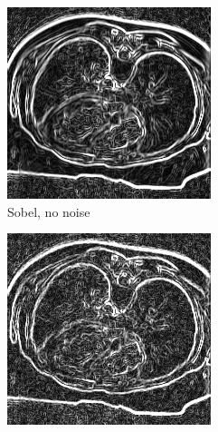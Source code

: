 \begin{figure}[H]
  \centering
  
  \begin{subfigure}{.5\textwidth}
    \centering
    \includegraphics[width=.9\textwidth]{./edgedetection/images/sobel_no_noise}
    \caption{Sobel, no noise}
    \label{fig:sobel_no_noise}
  \end{subfigure}%
  \begin{subfigure}{.5\textwidth}
    \centering
    \includegraphics[width=.9\textwidth]{./edgedetection/images/sobel_001_noise}

\end{subfigure}
\end{figure}
